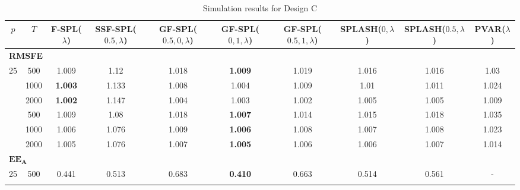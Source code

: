 \begin{landscape}
    \bgroup
    \def\arraystretch{1.3}
    \begin{table}[p]
    \footnotesize
    \centering
    \caption{Simulation results for Design C}
    \label{tab:results_designC}
    \begin{tabular}{cccccccccc}    
    \hline \hline
    $p$  &  $T$   &  F-SPL($\lambda$)  & SSF-SPL($0.5, \lambda$)  &  GF-SPL($0.5, 0, \lambda$)  &  GF-SPL($0, 1, \lambda$)  &  GF-SPL($0.5, 1, \lambda$)  &  SPLASH($0, \lambda$)  &  SPLASH($0.5, \lambda$)  &  PVAR($\lambda$)  \\
    \hline
    \multicolumn{10}{l}{\textbf{RMSFE}} \\
	\hline
	 25  & 500  & 1.009              &           1.12            &            1.018            & \textbf{1.009}            &            1.019            &         1.016          &          1.016           &       1.03        \\ \hdashline
	 25  & 1000 & \textbf{1.003}     &           1.133           &            1.008            & 1.004                     &            1.009            &          1.01          &          1.011           &       1.024       \\ \hdashline
	 25  & 2000 & \textbf{1.002}     &           1.147           &            1.004            & 1.003                     &            1.002            &         1.005          &          1.005           &       1.009       \\ \hdashline
	 36  & 500  & 1.009              &           1.08            &            1.018            & \textbf{1.007}            &            1.014            &         1.015          &          1.018           &       1.035       \\ \hdashline
	 36  & 1000 & 1.006              &           1.076           &            1.009            & \textbf{1.006}            &            1.008            &         1.007          &          1.008           &       1.023       \\ \hdashline
	 36  & 2000 & 1.005              &           1.076           &            1.007            & \textbf{1.005}            &            1.006            &         1.006          &          1.007           &       1.014       \\
	\hline
	\multicolumn{10}{l}{$\mathbf{EE_A}$} \\
	\hline
	 25  & 500  &       0.441        &           0.513           &            0.683            & \textbf{0.410}            &            0.663            & 0.514                  &          0.561           & -                 \\ \hdashline

\end{tabular}
\end{table}
\end{landscape}
